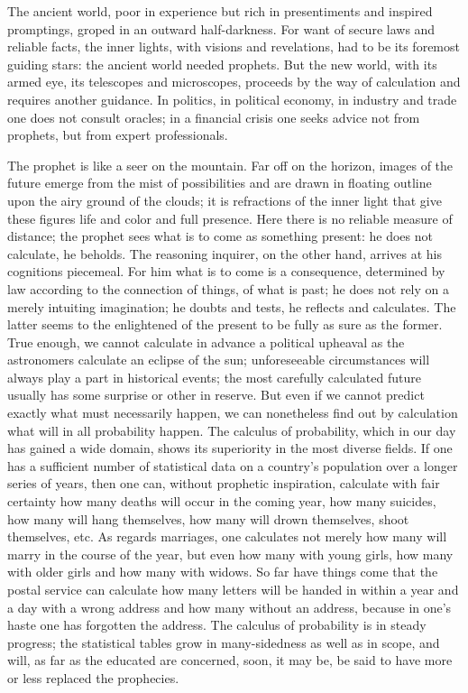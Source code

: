 \documentclass[12pt,a4paper,openany]{book}
\newcommand{\opage}[1]{\marginnote{\footnotesize\textit{[#1]}}}
\begin{document}
The ancient world, poor in experience but rich
in presentiments and inspired promptings, groped in an outward
half-darkness. For want of secure laws and reliable
facts, the inner lights, with
visions and revelations, had to be its foremost guiding stars:
the ancient world needed prophets. But
the new world, with its armed eye, its telescopes
and microscopes, proceeds by the way of calculation and
requires another guidance. In politics, in political economy,
in industry and trade one does not consult
oracles; in a financial crisis one seeks advice not from
prophets, but from expert professionals.

\setcounter{footnote}{0}%
\opage{2}The prophet is like a seer on the mountain. Far off on the
horizon, images of the future emerge from the mist of possibilities
and are drawn in floating outline upon the airy
ground of the clouds; it is refractions of the inner
light that give these figures life and color and full
presence. Here there is no reliable measure of distance;
the prophet sees what is to come as something present:
he does not calculate, he beholds. The reasoning inquirer,
on the other hand, arrives at his cognitions piecemeal. For
him what is to come is a consequence, determined by law according to the connection of things,
of what is past; he does not rely
on a merely intuiting imagination; he doubts and
tests, he reflects and calculates. The latter seems
to the enlightened of the present to be fully as sure as
the former. True enough, we cannot calculate in advance
a political upheaval as the astronomers calculate an
eclipse of the sun; unforeseeable circumstances will always
play a part in historical events; the most carefully
calculated future usually has some surprise or other
in reserve. But even if we cannot
predict exactly what must necessarily happen, we
can nonetheless find out by calculation what will in all
probability happen. The calculus of probability, which
in our day has gained a wide domain, shows its
superiority in the most diverse fields. If
one has a sufficient number of statistical data on a country's
population over a longer series of years, then
one can, without prophetic inspiration, calculate with fair
certainty how many deaths will occur
in the coming year, how many suicides, how many
will hang themselves, how many will drown
themselves, shoot themselves, etc. As regards marriages,
\setcounter{footnote}{0}%
\opage{3}one calculates not merely how many will marry in the course of the year,
but even how many with young girls, how many
with older girls and how many with widows. So far
have things come that the postal service can calculate how many
letters will be handed in within a year and a day
with a wrong address and how many without an address,
because in one's haste one has forgotten the address. The calculus of probability
is in steady progress; the statistical
tables grow in many-sidedness as well as in scope, and
will, as far as the educated are concerned, soon, it may be, be said
to have more or less replaced the prophecies.
\end{document}
